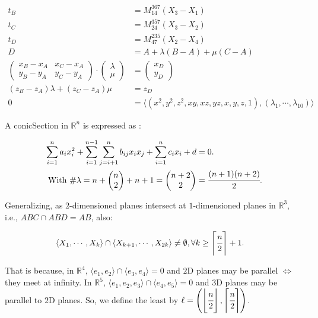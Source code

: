 \documentclass[12pt]{article}
\begin{document}
\begin{align}
t_B &= M_{14}^{367} (X_3 - X_1)\\
t_C &= M_{24}^{357} (X_3 - X_2) \\
t_D &= M_{47}^{235} (X_2 - X_4) \\
D &= A + \lambda (B - A) + \mu (C - A) \\
\begin{pmatrix}
    x_B - x_A & x_C - x_A \\
    y_B - y_A & y_C - y_A
\end{pmatrix} \cdot \begin{pmatrix}
    \lambda \\ \mu
\end{pmatrix} &= \begin{pmatrix}
    x_D \\ y_D 
\end{pmatrix} \\
(z_B - z_A) \lambda + (z_C - z_A)\mu &= z_D \\
0 &= \langle (x^2, y^2, z^2, xy, xz, yz, x, y, z, 1), (\lambda_1, \cdots, \lambda_{10})\rangle
\end{align}

A conicSection in $\mathbb{R}^n$ is expressed as :

\begin{align}
    \sum_{i=1}^n a_i x_i^2 +\sum_{i=1}^{n-1} \sum_{j=i+1}^n b_{ij} x_i x_j +  \sum_{i=1}^n c_i x_i + d &= 0. \\
    \text{With }\# \lambda = n + \begin{pmatrix}
        n \\ 2
    \end{pmatrix} + n + 1 = \begin{pmatrix}
        n + 2 \\ 2
    \end{pmatrix} &= \cfrac{(n+1)(n+2)}{2}.
\end{align}

Generalizing, as $2$-dimensioned planes intersect at $1$-dimensioned planes in $\mathbb{R}^3$, i.e., $ABC \cap ABD = AB$, also:

\begin{align}
\langle X_1, \cdots, X_k \rangle \cap \langle X_{k+1}, \cdots, X_{2k} \rangle &\ne \emptyset, \forall k \ge \left\lceil\cfrac{n}{2}\right\rceil + 1.
\end{align}

That is because, in $\mathbb{R}^4$, $\langle e_1, e_2 \rangle \cap \langle e_3, e_4 \rangle = 0$ and $2$D planes may be parallel $\Leftrightarrow$ they meet at infinity. In $\mathbb{R}^5$, $\langle e_1, e_2, e_3 \rangle \cap \langle e_4, e_5 \rangle = 0$ and $3$D planes may be parallel to $2$D planes. So, we define the least by $\ell = \left(\left\lfloor \cfrac{n}{2} \right\rfloor,\left\lceil \cfrac{n}{2} \right\rceil\right)$.
\end{document}
